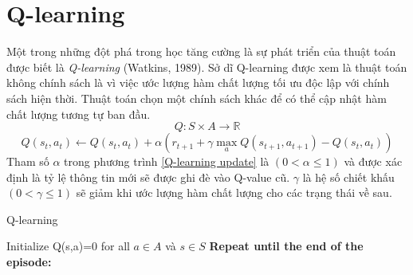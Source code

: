 \section{Q-learning}\label{Qlearning}
Một trong những đột phá trong học tăng cường là sự phát triển của thuật toán  được biết là \textit{Q-learning} (Watkins, 1989). Sở dĩ Q-learning được xem là thuật toán không chính sách là vì việc ước lượng hàm chất lượng tối ưu độc lập với chính sách hiện thời. Thuật toán chọn một chính sách khác để có thể cập nhật hàm chất lượng tương tự ban đầu.
\begin{equation}
    Q:S\times A \longrightarrow \mathbb{R}
\end{equation}
\begin{equation}\label{Q-learning update}
    Q(s_t,a_t)\leftarrow Q(s_t,a_t) + \alpha(r_{t+1} + \gamma \max_aQ(s_{t+1},a_{t+1})-Q(s_t,a_t))
\end{equation}
Tham số $\alpha$ trong phương trình \ref{Q-learning update} là  $(0<\alpha \le 1)$ và được xác định là tỷ lệ thông tin mới sẽ được ghi đè vào Q-value cũ. $\gamma$ là hệ số chiết khấu $(0<\gamma\le 1)$ sẽ giảm khi ước lượng hàm chất lượng cho các trạng thái về sau.
\clearpage
\begin{algorithm}
\caption{Q-learning}
\begin{algorithmic}[1]
\State Initialize Q(s,a)=0 for all $a\in A$ và $s \in S$
\State \textbf{Repeat until the end of the episode:}
\EndIf
\EndFor
\EndProcedure
\end{algorithmic}
\end{algorithm}
